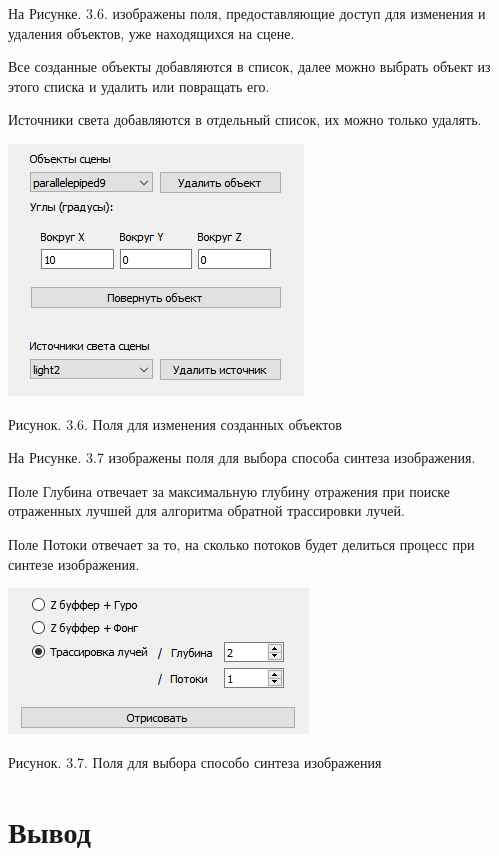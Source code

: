 \documentclass[12pt]{report}
\begin{document}
	На Рисунке. 3.6. изображены поля, предоставляющие доступ для изменения и удаления объектов, уже находящихся на сцене.
	
	Все созданные объекты добавляются в список, далее можно выбрать объект из этого списка и удалить или повращать его.
	
	Источники света добавляются в отдельный список, их можно только удалять.

	\begin{center}
		\includegraphics[scale=1]{changes.png}
		
		Рисунок. 3.6. Поля для изменения созданных объектов
	\end{center}
	
	На Рисунке. 3.7 изображены поля для выбора способа синтеза изображения.
	
	Поле Глубина отвечает за максимальную глубину отражения при поиске отраженных лучшей для алгоритма обратной трассировки лучей.
	
	Поле Потоки отвечает за то, на сколько потоков будет делиться процесс при синтезе изображения.
	
	\begin{center}
		\includegraphics[scale=1]{choose.png}
		
		Рисунок. 3.7. Поля для выбора способо синтеза изображения
	\end{center}

	\section*{Вывод}
	
\end{document}
